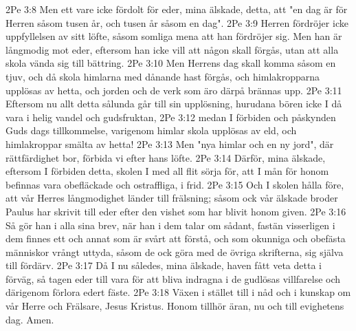 2Pe 3:8  Men ett vare icke fördolt för eder, mina älskade, detta, att "en dag är för Herren såsom tusen år, och tusen år såsom en dag".
2Pe 3:9  Herren fördröjer icke uppfyllelsen av sitt löfte, såsom somliga mena att han fördröjer sig. Men han är långmodig mot eder, eftersom han icke vill att någon skall förgås, utan att alla skola vända sig till bättring.
2Pe 3:10  Men Herrens dag skall komma såsom en tjuv, och då skola himlarna med dånande hast förgås, och himlakropparna upplösas av hetta, och jorden och de verk som äro därpå brännas upp.
2Pe 3:11  Eftersom nu allt detta sålunda går till sin upplösning, hurudana bören icke I då vara i helig vandel och gudsfruktan,
2Pe 3:12  medan I förbiden och påskynden Guds dags tillkommelse, varigenom himlar skola upplösas av eld, och himlakroppar smälta av hetta!
2Pe 3:13  Men "nya himlar och en ny jord", där rättfärdighet bor, förbida vi efter hans löfte.
2Pe 3:14  Därför, mina älskade, eftersom I förbiden detta, skolen I med all flit sörja för, att I mån för honom befinnas vara obefläckade och ostraffliga, i frid.
2Pe 3:15  Och I skolen hålla före, att vår Herres långmodighet länder till frälsning; såsom ock vår älskade broder Paulus har skrivit till eder efter den vishet som har blivit honom given.
2Pe 3:16  Så gör han i alla sina brev, när han i dem talar om sådant, fastän visserligen i dem finnes ett och annat som är svårt att förstå, och som okunniga och obefästa människor vrångt uttyda, såsom de ock göra med de övriga skrifterna, sig själva till fördärv.
2Pe 3:17  Då I nu således, mina älskade, haven fått veta detta i förväg, så tagen eder till vara för att bliva indragna i de gudlösas villfarelse och därigenom förlora edert fäste.
2Pe 3:18  Växen i stället till i nåd och i kunskap om vår Herre och Frälsare, Jesus Kristus. Honom tillhör äran, nu och till evighetens dag. Amen.


